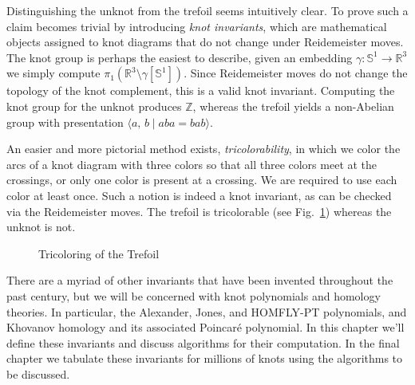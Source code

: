 Distinguishing the unknot from the trefoil seems intuitively clear. To prove
such a claim becomes trivial by introducing \textit{knot invariants}, which
are mathematical objects assigned to knot diagrams that do not change under
Reidemeister moves. The knot group is perhaps the easiest to describe, given
an embedding $\gamma:\mathbb{S}^{1}\rightarrow\mathbb{R}^{3}$ we simply
compute $\pi_{1}(\mathbb{R}^{3}\setminus\gamma[\mathbb{S}^{1}])$. Since
Reidemeister moves do not change the topology of the knot complement, this is
a valid knot invariant. Computing the knot group for the unknot produces
$\mathbb{Z}$, whereas the trefoil yields a non-Abelian group with presentation
$\langle{a,\,b}\;|\;aba=bab\rangle$.
\par\hfill\par
An easier and more pictorial method exists, \textit{tricolorability}, in which
we color the arcs of a knot diagram with three colors so that all three colors
meet at the crossings, or only one color is present at a crossing. We are
required to use each color at least once. Such a notion is indeed a knot
invariant, as can be checked via the Reidemeister moves. The trefoil is
tricolorable (see Fig.~\ref{fig:trefoil_tricolor}) whereas the unknot is not.
\par\hfill\par
\begin{figure}
    \centering
    \caption{Tricoloring of the Trefoil}
    \label{fig:trefoil_tricolor}
\end{figure}
There are a myriad of other invariants that have been invented throughout the
past century, but we will be concerned with knot polynomials and homology
theories. In particular, the Alexander, Jones, and HOMFLY-PT polynomials, and
Khovanov homology and its associated Poincar\'{e} polynomial. In this chapter
we'll define these invariants and discuss algorithms for their computation.
In the final chapter we tabulate these invariants for millions of knots
using the algorithms to be discussed.
